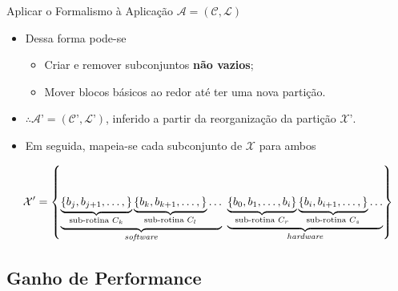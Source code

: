       \begin{frame}{Aplicar o Formalismo à Aplicação $\mathcal{A} = (\mathcal{C}, \mathcal{L})$}
         \begin{itemize}  \setlength{\itemsep}{0.6em}
            \item Dessa forma pode-se
            \begin{itemize}
               \item Criar e remover subconjuntos \textbf{não vazios};
               \item Mover blocos básicos ao redor até ter uma nova partição.
            \end{itemize}
   
            \item $\therefore \mathcal{A}’ = (\mathcal{C}’, \mathcal{L}’) $, inferido a partir da reorganização da partição $ \mathcal{X}’ $.
   
               \bigskip
   
            \item Em seguida, mapeia-se cada subconjunto de $ \mathcal{X} $ para ambos \hs
   
         \end{itemize}
            { \footnotesize
            \begin{equation}
               \mathcal{X}'   = \left \{
               \underbrace{
                  \underbrace{
                     \left \{ b_j, b_{j+1}, \dots, \right \}
                  }_{\text{sub-rotina }C_k}
                  \underbrace{
                     \left \{ b_k, b_{k+1}, \dots, \right \}
                  }_{\text{sub-rotina }C_l}
                  \dots
               }_{\text{\textit{software}}}
               \
               \underbrace{
                  \underbrace{
                     \left \{ b_0, b_1, \dots, b_i \right \}
                  }_{\text{sub-rotina }C_r}
                  \underbrace{
                     \left \{ b_i, b_{i+1}, \dots, \right \}
                  }_{\text{sub-rotina }C_s}
                  \dots
               }_{\text{\textit{hardware}}}
               \right \} \label{eq:part_final}
            \end{equation}
            }
      \end{frame}
   
   
   
   \subsection{Ganho de Performance}
   
